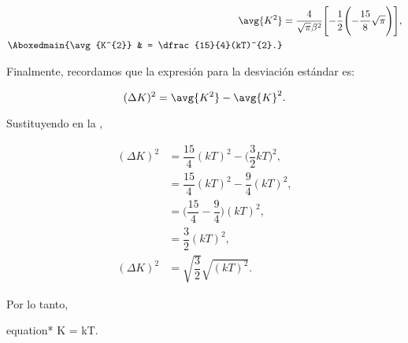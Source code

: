 \documentclass[../main.tex]{subfiles}
\begin{document}
\begin{problema}[10]
	\begin{align}
		\avg{K^{2}}             & = \dfrac{4}{\sqrt{\pi}\beta^{2}}\Biggl[-\dfrac{1}{2}\Biggl(-\dfrac{15}{8}\sqrt{\pi}\Biggr)\Biggr],\nonumber \\
		\Aboxedmain{\avg{K^{2}} & = \dfrac{15}{4}(kT)^{2}.}\label{eq:AvgKSqrd}
	\end{align}

	Finalmente, recordamos que la expresión para la desviación estándar es:

	\begin{equation}
		(\Delta K)^{2} = \avg{K^{2}} - \avg{K}^{2}.
		\label{eq:StdDeviation}
	\end{equation}

	Sustituyendo  en la ,

	\begin{align*}
		(\Delta K)^{2} & = \dfrac{15}{4}(kT)^{2} - \biggl(\dfrac{3}{2}kT\biggr)^{2}, \\
		               & = \dfrac{15}{4}(kT)^{2} - \dfrac{9}{4}(kT)^{2},             \\
		               & = \biggl(\dfrac{15}{4} - \dfrac{9}{4}\biggr)(kT)^{2},       \\
		               & = \dfrac{3}{2}(kT)^{2},                                     \\
		(\Delta K)^{2} & = \sqrt{\dfrac{3}{2}}\sqrt{(kT)^{2}}.
	\end{align*}

	Por lo tanto,

	\begin{empheq}[box=\mainresult]{equation*}
		\Delta K = kT.
	\end{empheq}
\end{problema}
\end{document}
